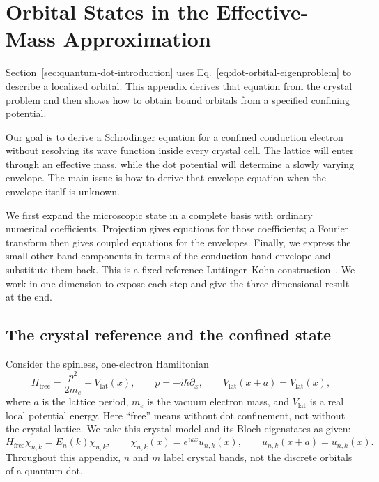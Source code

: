 \FloatBarrier
\section{Orbital States in the Effective-Mass Approximation}
\label{app:effective-mass}
\label{sec:confinement-single-electron}

Section~\ref{sec:quantum-dot-introduction} uses
Eq.~\eqref{eq:dot-orbital-eigenproblem} to describe a localized orbital.
This appendix derives that equation from the crystal problem and then
shows how to obtain bound orbitals from a specified confining potential.


Our goal is to derive a Schr\"odinger equation for a confined
conduction electron without resolving its wave function inside
every crystal cell. The lattice will enter through an effective
mass, while the dot potential will determine a slowly varying
envelope. The main issue is how to derive that envelope equation
when the envelope itself is unknown.

We first expand the microscopic state in a complete basis with
ordinary numerical coefficients. Projection gives equations for
those coefficients; a Fourier transform then gives coupled
equations for the envelopes. Finally, we express the small
other-band components in terms of the conduction-band envelope
and substitute them back. This is a fixed-reference
Luttinger--Kohn construction~\cite{LuttingerKohn1955}.
We work in one dimension to expose each step and give the
three-dimensional result at the end.

\subsection{The crystal reference and the confined state}
\label{sec:em-crystal-reference}

Consider the spinless, one-electron Hamiltonian
\begin{equation}
  H_{\mathrm{free}}=\frac{p^2}{2m_e}+V_{\mathrm{lat}}(x),
  \qquad p=-i\hbar\partial_x,
  \qquad V_{\mathrm{lat}}(x+a)=V_{\mathrm{lat}}(x),
  \label{eq:em-crystal-hamiltonian}
\end{equation}
where $a$ is the lattice period, $m_e$ is the vacuum electron
mass, and $V_{\mathrm{lat}}$ is a real local potential energy.
Here ``free'' means without dot
confinement, not without the crystal lattice. We take this
crystal model and its Bloch eigenstates as given:
\begin{equation}
  H_{\mathrm{free}}\chi_{n,k}=E_n(k)\chi_{n,k},
  \qquad
  \chi_{n,k}(x)=e^{ikx}u_{n,k}(x),
  \qquad u_{n,k}(x+a)=u_{n,k}(x).
  \label{eq:em-bloch-states}
\end{equation}
Throughout this appendix, $n$ and $m$ label crystal bands, not
the discrete orbitals of a quantum dot.

